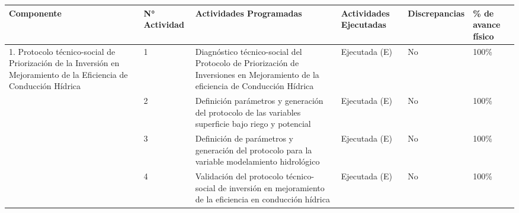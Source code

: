 \documentclass[]{article}
\begin{document}
\begin{table}[!htb]
\centering
\resizebox{16cm}{!} {
\begin{tabular}{|p{3cm}|p{1.6cm}|p{3.9cm}|p{2.5cm}|p{2.5cm}|p{1.5cm}|}
    \hline
    \textbf{Componente} & \textbf{N° Actividad} & \textbf{Actividades Programadas} & \textbf{Actividades Ejecutadas} & \textbf{Discrepancias} & \textbf{\% de avance físico}\\
    \hline
    \multirow {4}{3cm}{1. Protocolo técnico-social de Priorización de la Inversión en Mejoramiento de la Eficiencia de Conducción Hídrica} & 1 & 		Diagnóstico técnico-social del Protocolo de Priorización de Inversiones en Mejoramiento de la eficiencia de Conducción Hídrica &  Ejecutada (E)  & No & 100\%\\
    \cline{2-6}
    & 2 & Definición parámetros y generación del protocolo de las variables superficie bajo riego y potencial & Ejecutada (E) & No & 100\%\\
    \cline{2-6}
    & 3 & Definición de parámetros y generación del protocolo para la variable modelamiento hidrológico & Ejecutada (E)  & No & 100\%\\
    \cline{2-6}
    & 4 & Validación del protocolo técnico-social de inversión en mejoramiento de la eficiencia en conducción hídrica & Ejecutada (E)  & No & 100\%\\
    \hline
   
\end{tabular}
}
\end{table}
\end{document}
